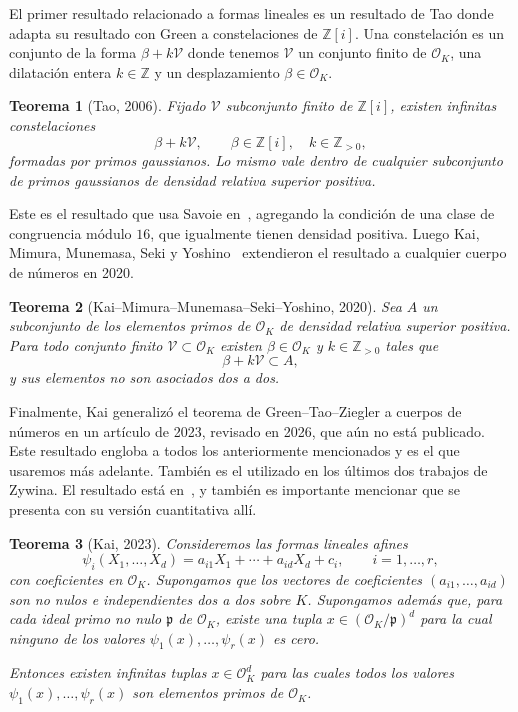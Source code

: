 \documentclass[a4paper]{book}
\theoremstyle{definition}
\theoremstyle{plain}
\newtheorem*{theorem*}{Teorema}
\newcommand{\ZZ}{\mathbb{Z}}
\newcommand{\OO}{\mathcal{O}}
\newcommand{\pp}{\mathfrak{p}}
\begin{document}
El primer resultado relacionado a formas lineales es un resultado de Tao donde adapta su resultado con Green a constelaciones de $\ZZ[i]$. Una constelación es un conjunto de la forma $\beta+k\mathcal{V}$ donde tenemos $\mathcal{V}$ un conjunto finito de $\OO_K$, una dilatación entera $k\in\ZZ$ y un desplazamiento $\beta \in \OO_K$. 

\begin{theorem*}[Tao, 2006]
Fijado $\mathcal{V}$ subconjunto finito de $\ZZ[i]$, existen infinitas constelaciones
\[
\beta+k\mathcal V,\qquad \beta\in\ZZ[i],\quad k\in\ZZ_{>0},
\]
formadas por primos gaussianos. Lo mismo vale dentro de cualquier subconjunto de primos gaussianos de densidad relativa superior positiva.
\end{theorem*}

Este es el resultado que usa Savoie en~\cite{Savoie2025QiRank2}, agregando la condición de una clase de congruencia módulo $16$, que igualmente tienen densidad positiva. Luego Kai, Mimura, Munemasa, Seki y Yoshino~\cite{KaiMimuraMunemasaSekiYoshino2020} extendieron el resultado a cualquier cuerpo de números en 2020. 

\begin{theorem*}[Kai--Mimura--Munemasa--Seki--Yoshino, 2020]
Sea $A$ un subconjunto de los elementos primos de $\OO_K$ de densidad relativa superior positiva. Para todo conjunto finito $\mathcal V\subset\OO_K$ existen $\beta\in\OO_K$ y $k\in\ZZ_{>0}$ tales que
\[
\beta+k\mathcal V\subset A,
\]
y sus elementos no son asociados dos a dos.
\end{theorem*}

Finalmente, Kai generalizó el teorema de Green--Tao--Ziegler a cuerpos de números en un artículo de 2023, revisado en 2026, que aún no está publicado. Este resultado engloba a todos los anteriormente mencionados y es el que usaremos más adelante. También es el utilizado en los últimos dos trabajos de Zywina. El resultado está en~\cite{Kai2026Patrones}, y también es importante mencionar que se presenta con su versión cuantitativa allí.

\begin{theorem*}[Kai, 2023]
Consideremos las formas lineales afines
\[
\psi_i(X_1,\ldots,X_d)=a_{i1}X_1+\cdots+a_{id}X_d+c_i,\qquad i=1,\ldots,r,
\]
con coeficientes en $\OO_K$. Supongamos que los vectores de coeficientes $(a_{i1},\ldots,a_{id})$ son no nulos e independientes dos a dos sobre $K$. Supongamos además que, para cada ideal primo no nulo $\pp$ de $\OO_K$, existe una tupla $x\in{(\OO_K/\pp)}^d$ para la cual ninguno de los valores $\psi_1(x),\ldots,\psi_r(x)$ es cero.

Entonces existen infinitas tuplas $x\in\OO_K^d$ para las cuales todos los valores $\psi_1(x),\ldots,\psi_r(x)$ son elementos primos de $\OO_K$.
\end{theorem*}
\end{document}
